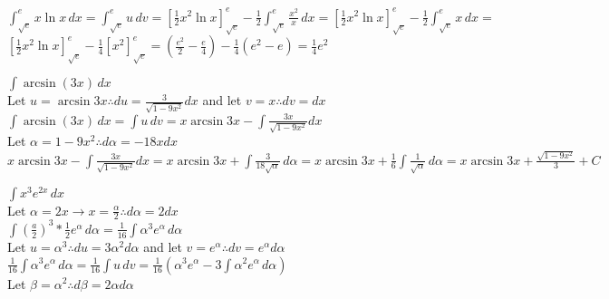 \documentclass[10pt, letterpaper]{report}
\begin{document}
\begin{enumerate}
{    $\int_{\sqrt{e}}^{e}{x\ln{x}}\,dx=\int_{\sqrt{e}}^{e}{u}\,dv=
    [\frac{1}{2}x^{2}\ln{x}]_{\sqrt{e}}^{e}-\frac{1}{2}\int_{\sqrt{e}}^{e}{\frac{x^{2}}{x}}\,dx=
    [\frac{1}{2}x^{2}\ln{x}]_{\sqrt{e}}^{e}-\frac{1}{2}\int_{\sqrt{e}}^{e}{x}\,dx=$ \\

    $[\frac{1}{2}x^{2}\ln{x}]_{\sqrt{e}}^{e}-\frac{1}{4}[x^{2}]_{\sqrt{e}}^{e}=
    \left(\frac{e^{2}}{2}-\frac{e}{4}\right)-\frac{1}{4}\left(e^{2}-e\right)=
    \frac{1}{4}e^{2}$ \\

  \item{$\int{\arcsin{(3x)}}\,dx$} \\

    Let $u=\arcsin{3x}\therefore du=\frac{3}{\sqrt{1-9x^2}}dx$ and let $v=x\therefore dv=dx$ \\

    $\int{\arcsin{(3x)}}\,dx=\int{u}\,dv=x\arcsin{3x}-\int{\frac{3x}{\sqrt{1-9x^2}}dx}$ \\

    Let $\alpha=1-9x^{2}\therefore d\alpha=-18xdx$ \\

    $x\arcsin{3x}-\int{\frac{3x}{\sqrt{1-9x^2}}dx}=x\arcsin{3x}+\int{\frac{3}{18\sqrt{\alpha}}\,d\alpha}=
    x\arcsin{3x}+\frac{1}{6}\int{\frac{1}{\sqrt{\alpha}}}\,d\alpha=
    x\arcsin{3x}+\frac{\sqrt{1-9x^{2}}}{3}+C$ \\

  \item{$\int{x^{3}e^{2x}}\,dx$} \\

    Let $\alpha=2x\rightarrow x=\frac{\alpha}{2}\therefore d\alpha=2dx$ \\

    $\int{\left(\frac{a}{2}\right)^{3}*\frac{1}{2}e^{\alpha}}\,d\alpha=
    \frac{1}{16}\int{\alpha^{3}e^{\alpha}}\,d\alpha$ \\

    Let $u=\alpha^{3}\therefore du=3\alpha^{2}d\alpha$ and let $v=e^{\alpha}\therefore dv=e^{\alpha}d\alpha$ \\

    $\frac{1}{16}\int{\alpha^{3}e^{\alpha}}\,d\alpha=\frac{1}{16}\int{u}\,dv=
    \frac{1}{16}\left(\alpha^{3}e^{\alpha}-3\int{\alpha^{2}e^{\alpha}}\,d\alpha\right)$ \\

    Let $\beta=\alpha^{2}\therefore d\beta=2\alpha d\alpha$ \\

}
\end{enumerate}
\end{document}
